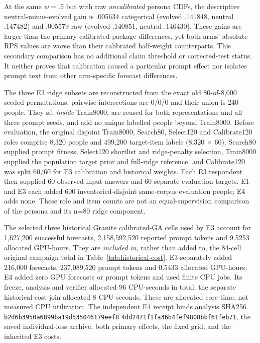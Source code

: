 At the same $w=.5$ but with raw \emph{uncalibrated} persona CDFs, the
descriptive neutral-minus-evolved gain is .005634 categorical (evolved
.141848, neutral .147482) and .005579 raw (evolved .140851, neutral .146430).
These gains are larger than the primary calibrated-package differences, yet
both arms' absolute RPS values are worse than their calibrated half-weight
counterparts. This secondary comparison has no additional claim threshold
or corrected-test status. It neither proves that calibration caused a
particular prompt effect nor isolates prompt text from other arm-specific
forecast differences.

The three E3 ridge subsets are reconstructed from the exact old
80-of-8,000 seeded permutations; pairwise intersections are 0/0/0 and their
union is 240 people. They sit \emph{inside} Train8000, are reused for both
representations and all three prompt seeds, and add no unique labelled people
beyond Train8000. Before evaluation, the original disjoint Train8000,
Search80, Select120 and Calibrate120 roles comprise 8,320 people and
499,200 target-item labels (8,320 $\times$ 60). Search80 supplied prompt
fitness, Select120 shortlist and ridge-penalty selection, Train8000 supplied
the population target prior and full-ridge reference, and Calibrate120 was
split 60/60 for E3 calibration and historical weights. Each E3 respondent
then supplied 60 observed input answers and 60 separate evaluation targets.
E1 and E3 each added 600 inventoried-disjoint same-corpus evaluation people;
E4 adds none. These role and item counts are not an equal-supervision
comparison of the persona and its n=80 ridge component.

The selected three historical Granite calibrated-GA cells used by E3 account
for 1,627,200 successful forecasts, 2,158,592,520 reported prompt tokens and
9.5253 allocated GPU-hours. They are \emph{included in}, rather than added to,
the 84-cell original campaign total in Table~\ref{tab:historical-cost}.
E3 separately added 216,000 forecasts, 237,089,520 prompt tokens and
0.5433 allocated GPU-hours; E4 added zero GPU forecasts or prompt tokens and
used finite CPU jobs. Its freeze, analysis and verifier allocated 96
CPU-seconds in total; the separate historical cost join allocated 8 CPU-seconds.
These are allocated core-time, not measured CPU utilization. The independent E4 receipt binds analysis SHA256
\texttt{b2d6b3950a6899ba19d535046179eef8}\allowbreak
\texttt{4dd2471f1fa36b4fef9808bbf61feb71},
the saved individual-loss archive, both primary effects, the fixed grid,
and the inherited E3 costs.

